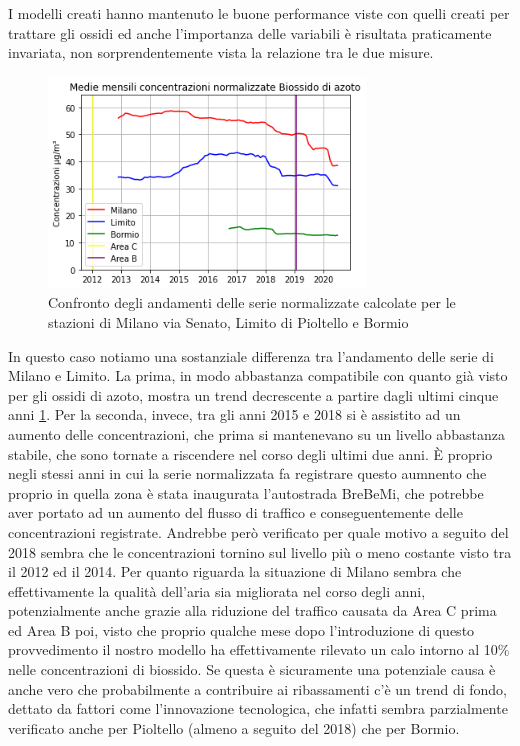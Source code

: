 \documentclass[a4paper,12pt]{report}
\begin{document}
I modelli creati hanno mantenuto le buone performance viste con quelli creati per trattare gli ossidi ed anche l'importanza delle variabili è risultata praticamente invariata, non sorprendentemente vista la relazione tra le due misure.

\begin{figure}[h]
\centering
\includegraphics[width=0.75\textwidth]{no2_traffico}
\caption{Confronto degli andamenti delle serie normalizzate calcolate per le stazioni di Milano via Senato, Limito di Pioltello e Bormio}
\label{fig:no2_traffico}
\end{figure}

In questo caso notiamo una sostanziale differenza tra l'andamento delle serie di Milano e Limito. La prima, in modo abbastanza compatibile con quanto già visto per gli ossidi di azoto, mostra un trend decrescente a partire dagli ultimi cinque anni \ref{fig:no2_traffico}. Per la seconda, invece, tra gli anni 2015 e 2018 si è assistito ad un aumento delle concentrazioni, che prima si mantenevano su un livello abbastanza stabile, che sono tornate a riscendere nel corso degli ultimi due anni. È proprio negli stessi anni in cui la serie normalizzata fa registrare questo aumnento che proprio in quella zona è stata inaugurata l'autostrada BreBeMi, che potrebbe aver portato ad un aumento del flusso di traffico e conseguentemente delle concentrazioni registrate. Andrebbe però verificato per quale motivo a seguito del 2018 sembra che le concentrazioni tornino sul livello più o meno costante visto tra il 2012 ed il 2014.
Per quanto riguarda la situazione di Milano sembra che effettivamente la qualità dell'aria sia migliorata nel corso degli anni, potenzialmente anche grazie alla riduzione del traffico causata da Area C prima ed Area B poi, visto che proprio qualche mese dopo l'introduzione di questo provvedimento il nostro modello ha effettivamente rilevato un calo intorno al 10\% nelle concentrazioni di biossido. Se questa è sicuramente una potenziale causa è anche vero che probabilmente a contribuire ai ribassamenti c'è un trend di fondo, dettato da fattori come l'innovazione tecnologica, che infatti sembra parzialmente verificato anche per Pioltello (almeno a seguito del 2018) che per Bormio.
\end{document}
